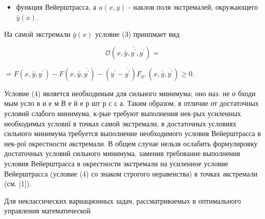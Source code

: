 \documentclass[10pt]{article}
\begin{document}
\begin{itemize}

  \item функция Вейерштрасса, а $u(x, y)$ - наклов поля экстремалей, окружающего $\bar{y}(x)$.

\end{itemize}



На самой экстремали $\bar{y}(x)$ условие (3) прннпмает вид



\[

\mathscr{O}\left(x, \bar{y}, \overline{y^{\prime}}, y^{\prime}\right)=

\]



$=F\left(x, \bar{y}, y^{\prime}\right)-F\left(x, \bar{y}, \overline{y^{\prime}}\right)-\left(y^{\prime}-\overline{y^{\prime}}\right) F_{y},\left(x, \bar{y}, \overline{y^{\prime}}\right) \geqslant 0$.



Условие (4) является необходимым для сильного минимума; оно наз. не о бходи мым усло в и е м В е й е р шт р с с а. Таким образом, в отличие от достаточных условий слабого минимума, к-рые требуют выполнения нек-рых усиленных необходимых условиї в точках самой экстремали, в достаточных условиях сильного минимума требуется выполнение необходимого условия Вейерштрасса в нек-рої окрестности әкстремали. В общем случае нельзя ослабить формулировку достаточных условий сильного минимума, заменив требование выполнения условия Вейерштрасса в окрестности экстремали на усиленное условие Вейерштрасса (условие (4) со знаком строгого неравенства) в точках әкстремали (см. [1]).



Для неклассических вариационных задач, рассматриваемых в оптимального управления математической
\end{document}
